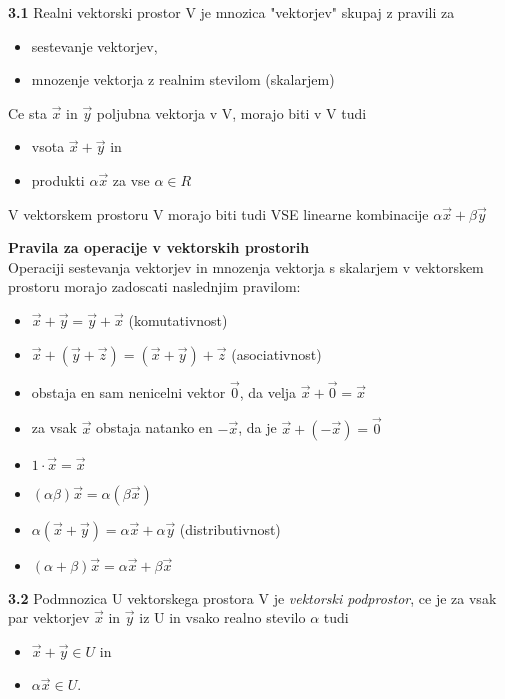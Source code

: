 \documentclass{article}
\begin{document}
\begin{multicols}{2}
	\textbf{3.1} Realni vektorski prostor V je mnozica "vektorjev" skupaj z pravili za
	\begin{itemize}
		\item sestevanje vektorjev,
		\item mnozenje vektorja z realnim stevilom (skalarjem)
	\end{itemize}
	Ce sta $\vec{x}$ in $\vec{y}$ poljubna vektorja v V, morajo biti v V tudi
	\begin{itemize}
		\item vsota $\vec{x} + \vec{y}$ in
		\item produkti $\alpha\vec{x}$ za vse $\alpha \in R$
	\end{itemize}
	V vektorskem prostoru V morajo biti tudi VSE linearne kombinacije
	$\alpha\vec{x} + \beta\vec{y}$

	\textbf{Pravila za operacije v vektorskih prostorih}\\
	Operaciji sestevanja vektorjev in mnozenja vektorja s skalarjem v vektorskem prostoru
	morajo zadoscati naslednjim pravilom:
	\begin{itemize}
		\item $\vec{x} + \vec{y} = \vec{y} + \vec{x}$ (komutativnost)
		\item $\vec{x} + (\vec{y} + \vec{z}) = (\vec{x} + \vec{y}) + \vec{z}$ (asociativnost)
		\item obstaja en sam nenicelni vektor $\vec{0}$, da velja $\vec{x} + \vec{0} = \vec{x}$
		\item za vsak $\vec{x}$ obstaja natanko en $-\vec{x}$, da je $\vec{x} + (-\vec{x}) = \vec{0}$
		\item $1 \cdot \vec{x} = \vec{x}$
		\item $(\alpha\beta)\vec{x} = \alpha(\beta\vec{x})$
		\item $\alpha(\vec{x} + \vec{y}) = \alpha\vec{x} + \alpha\vec{y}$ (distributivnost)
		\item $(\alpha + \beta)\vec{x} = \alpha\vec{x} + \beta\vec{x}$
	\end{itemize}

	\textbf{3.2} Podmnozica U vektorskega prostora V je \textit{vektorski podprostor}, ce je za
	vsak par vektorjev $\vec{x}$ in $\vec{y}$ iz U in vsako realno stevilo $\alpha$ tudi
	\begin{itemize}
		\item $\vec{x} + \vec{y} \in U$ in
		\item $\alpha\vec{x} \in U$.
	\end{itemize}


\end{multicols}
\end{document}
